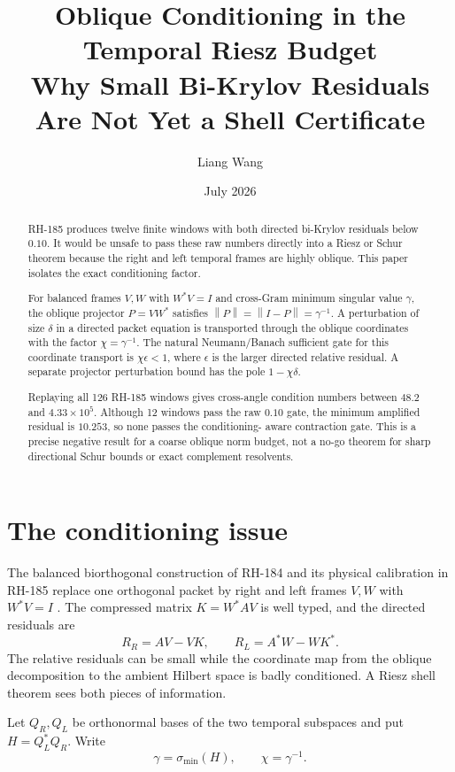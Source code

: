 \documentclass[12pt]{article}
\title{Oblique Conditioning in the Temporal Riesz Budget\\
\large Why Small Bi-Krylov Residuals Are Not Yet a Shell Certificate}
\author{Liang Wang}
\date{July 2026}
\theoremstyle{remark}
\newcommand{\norm}[1]{\left\lVert#1\right\rVert}
\begin{document}
\maketitle

\begin{abstract}
RH-185 produces twelve finite windows with both directed bi-Krylov residuals
below $0.10$.  It would be unsafe to pass these raw numbers directly into a
Riesz or Schur theorem because the right and left temporal frames are highly
oblique.  This paper isolates the exact conditioning factor.

For balanced frames $V,W$ with $W^*V=I$ and cross-Gram minimum singular value
$\gamma$, the oblique projector $P=VW^*$ satisfies
$\norm P=\norm{I-P}=\gamma^{-1}$.  A perturbation of size $\delta$ in a
directed packet equation is transported through the oblique coordinates with
the factor $\chi=\gamma^{-1}$.  The natural Neumann/Banach sufficient gate
for this coordinate transport is $\chi\epsilon<1$, where $\epsilon$ is the
larger directed relative residual.  A separate projector perturbation bound
has the pole $1-\chi\delta$.

Replaying all 126 RH-185 windows gives cross-angle condition numbers between
$48.2$ and $4.33\times10^5$.  Although 12 windows pass the raw $0.10$ gate,
the minimum amplified residual is $10.253$, so none passes the conditioning-
aware contraction gate.  This is a precise negative result for a coarse
oblique norm budget, not a no-go theorem for sharp directional Schur bounds
or exact complement resolvents.
\end{abstract}

\section{The conditioning issue}

The balanced biorthogonal construction of RH-184 and its physical calibration
in RH-185 replace one orthogonal packet by right and left frames $V,W$
with $W^*V=I$ \citep{WangRH184,WangRH185}.  The compressed matrix
$K=W^*AV$ is well typed, and the directed residuals are
\begin{equation}\label{eq:residuals}
 R_R=AV-VK,
 \qquad R_L=A^*W-WK^*.
\end{equation}
The relative residuals can be small while the coordinate map from the oblique
decomposition to the ambient Hilbert space is badly conditioned.  A Riesz
shell theorem sees both pieces of information.

Let $Q_R,Q_L$ be orthonormal bases of the two temporal subspaces and put
$H=Q_L^*Q_R$.  Write
\begin{equation}\label{eq:gamma}
 \gamma=\sigma_{\min}(H),
 \qquad \chi=\gamma^{-1}.
\end{equation}
\end{document}
